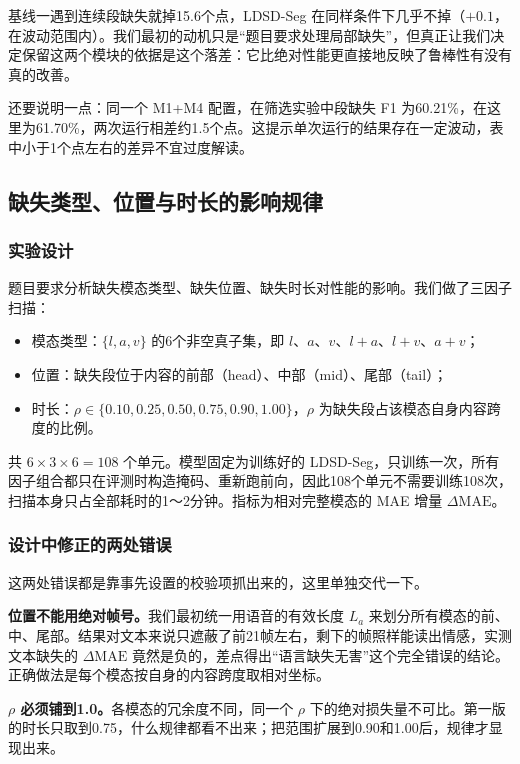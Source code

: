基线一遇到连续段缺失就掉15.6个点，LDSD-Seg 在同样条件下几乎不掉（$+0.1$，在波动范围内）。我们最初的动机只是“题目要求处理局部缺失”，但真正让我们决定保留这两个模块的依据是这个落差：它比绝对性能更直接地反映了鲁棒性有没有真的改善。

还要说明一点：同一个 M1+M4 配置，在筛选实验中段缺失 F1 为60.21\%，在这里为61.70\%，两次运行相差约1.5个点。这提示单次运行的结果存在一定波动，表中小于1个点左右的差异不宜过度解读。

\subsection{缺失类型、位置与时长的影响规律}\label{sec:factor}

\subsubsection{实验设计}

题目要求分析缺失模态类型、缺失位置、缺失时长对性能的影响。我们做了三因子扫描：
\begin{itemize}
\item 模态类型：$\{l,a,v\}$ 的6个非空真子集，即 $l$、$a$、$v$、$l{+}a$、$l{+}v$、$a{+}v$；
\item 位置：缺失段位于内容的前部（head）、中部（mid）、尾部（tail）；
\item 时长：$\rho\in\{0.10,0.25,0.50,0.75,0.90,1.00\}$，$\rho$ 为缺失段占该模态自身内容跨度的比例。
\end{itemize}
共 $6\times3\times6=108$ 个单元。模型固定为训练好的 LDSD-Seg，只训练一次，所有因子组合都只在评测时构造掩码、重新跑前向，因此108个单元不需要训练108次，扫描本身只占全部耗时的1～2分钟。指标为相对完整模态的 MAE 增量 $\Delta\mathrm{MAE}$。

\subsubsection{设计中修正的两处错误}

这两处错误都是靠事先设置的校验项抓出来的，这里单独交代一下。

\textbf{位置不能用绝对帧号。}我们最初统一用语音的有效长度 $L_a$ 来划分所有模态的前、中、尾部。结果对文本来说只遮蔽了前21帧左右，剩下的帧照样能读出情感，实测文本缺失的 $\Delta\mathrm{MAE}$ 竟然是负的，差点得出“语言缺失无害”这个完全错误的结论。正确做法是每个模态按自身的内容跨度取相对坐标。

\textbf{$\rho$ 必须铺到1.0。}各模态的冗余度不同，同一个 $\rho$ 下的绝对损失量不可比。第一版的时长只取到0.75，什么规律都看不出来；把范围扩展到0.90和1.00后，规律才显现出来。

